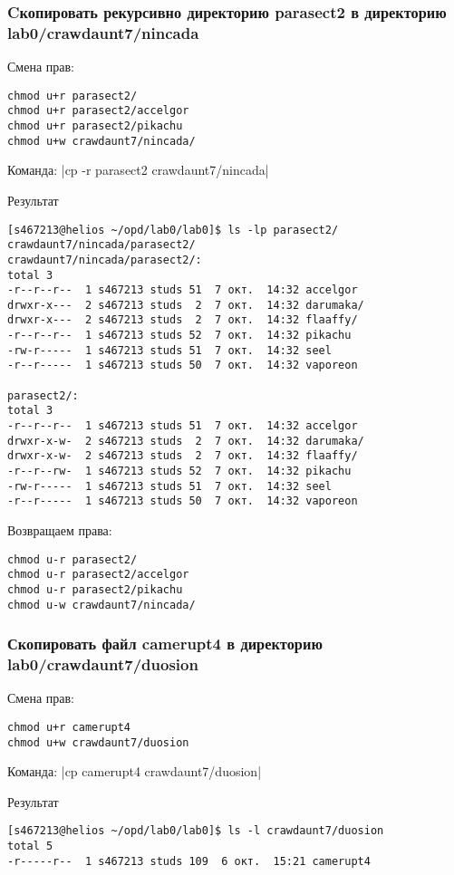 \subsubsection*{Cкопировать рекурсивно директорию parasect2 в директорию lab0/crawdaunt7/nincada}
Смена прав: 
\begin{verbatim}
chmod u+r parasect2/
chmod u+r parasect2/accelgor
chmod u+r parasect2/pikachu
chmod u+w crawdaunt7/nincada/
\end{verbatim}

Команда: |cp -r parasect2 crawdaunt7/nincada|

Результат
\begin{verbatim}
[s467213@helios ~/opd/lab0/lab0]$ ls -lp parasect2/ crawdaunt7/nincada/parasect2/
crawdaunt7/nincada/parasect2/:
total 3
-r--r--r--  1 s467213 studs 51  7 окт.  14:32 accelgor
drwxr-x---  2 s467213 studs  2  7 окт.  14:32 darumaka/
drwxr-x---  2 s467213 studs  2  7 окт.  14:32 flaaffy/
-r--r--r--  1 s467213 studs 52  7 окт.  14:32 pikachu
-rw-r-----  1 s467213 studs 51  7 окт.  14:32 seel
-r--r-----  1 s467213 studs 50  7 окт.  14:32 vaporeon

parasect2/:
total 3
-r--r--r--  1 s467213 studs 51  7 окт.  14:32 accelgor
drwxr-x-w-  2 s467213 studs  2  7 окт.  14:32 darumaka/
drwxr-x-w-  2 s467213 studs  2  7 окт.  14:32 flaaffy/
-r--r--rw-  1 s467213 studs 52  7 окт.  14:32 pikachu
-rw-r-----  1 s467213 studs 51  7 окт.  14:32 seel
-r--r-----  1 s467213 studs 50  7 окт.  14:32 vaporeon
\end{verbatim}

Возвращаем права:
\begin{verbatim}
chmod u-r parasect2/
chmod u-r parasect2/accelgor
chmod u-r parasect2/pikachu
chmod u-w crawdaunt7/nincada/
\end{verbatim}

\subsubsection*{Скопировать файл camerupt4 в директорию lab0/crawdaunt7/duosion}
Смена прав: 
\begin{verbatim}
chmod u+r camerupt4
chmod u+w crawdaunt7/duosion
\end{verbatim}

Команда: |cp camerupt4 crawdaunt7/duosion|

Результат
\begin{verbatim}
[s467213@helios ~/opd/lab0/lab0]$ ls -l crawdaunt7/duosion
total 5
-r-----r--  1 s467213 studs 109  6 окт.  15:21 camerupt4
\end{verbatim}


